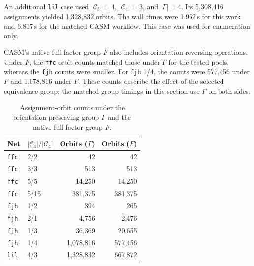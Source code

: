 \documentclass[a5paper, 10pt]{article}
\begin{document}
An additional \texttt{lil} case used $|\mathcal C_3|=4$, $|\mathcal C_4|=3$, and $|\Gamma|=4$. Its 5,308,416 assignments yielded 1,328,832 orbits. The wall times were 1.952\,s for this work and 6.817\,s for the matched CASM workflow. This case was used for enumeration only.

CASM's native full factor group $F$ also includes orientation-reversing operations. Under $F$, the \texttt{ffc} orbit counts matched those under $\Gamma$ for the tested pools, whereas the \texttt{fjh} counts were smaller. For \texttt{fjh} 1/4, the counts were 577,456 under $F$ and 1,078,816 under $\Gamma$. These counts describe the effect of the selected equivalence group; the matched-group timings in this section use $\Gamma$ on both sides.

\begin{table}[H]
\centering\scriptsize
\caption{Assignment-orbit counts under the orientation-preserving group $\Gamma$ and the native full factor group $F$.}
\begin{tabular}{llrr}
\toprule
Net & $|\mathcal C_3|/|\mathcal C_4|$ & Orbits ($\Gamma$) & Orbits ($F$) \\
\midrule
\texttt{ffc} & 2/2 & 42 & 42 \\
\texttt{ffc} & 3/3 & 513 & 513 \\
\texttt{ffc} & 5/5 & 14,250 & 14,250 \\
\texttt{ffc} & 5/15 & 381,375 & 381,375 \\
\texttt{fjh} & 1/2 & 394 & 265 \\
\texttt{fjh} & 2/1 & 4,756 & 2,476 \\
\texttt{fjh} & 1/3 & 36,369 & 20,655 \\
\texttt{fjh} & 1/4 & 1,078,816 & 577,456 \\
\texttt{lil} & 4/3 & 1,328,832 & 667,872 \\
\bottomrule
\end{tabular}
\end{table}
\end{document}
